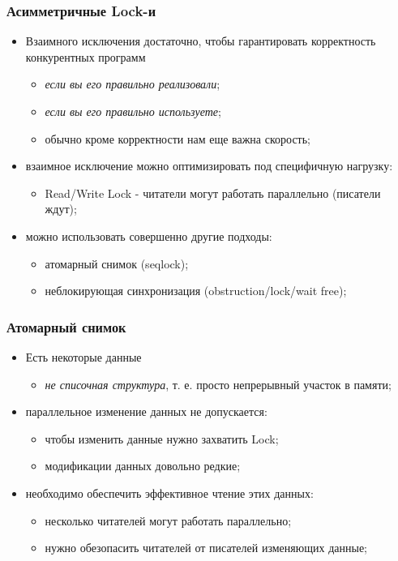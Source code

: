 \begin{frame}
\frametitle{Асимметричные Lock-и}

\begin{itemize}
  \item<1-> Взаимного исключения достаточно, чтобы гарантировать корректность
        конкурентных программ
        \begin{itemize}
          \item<2-> \emph{если вы его правильно реализовали};
          \item<3-> \emph{если вы его правильно используете};
          \item<4-> обычно кроме корректности нам еще важна скорость;
        \end{itemize}
  \item<5-> взаимное исключение можно оптимизировать под специфичную нагрузку:
        \begin{itemize}
          \item Read/Write Lock - читатели могут работать параллельно (писатели
                ждут);
        \end{itemize}
  \item<6-> можно использовать совершенно другие подходы:
        \begin{itemize}
          \item атомарный снимок (seqlock);
          \item неблокирующая синхронизация (obstruction/lock/wait free);
        \end{itemize}
\end{itemize}
\end{frame}

\begin{frame}
\frametitle{Атомарный снимок}

\begin{itemize}
  \item<1-> Есть некоторые данные
        \begin{itemize}
          \item \emph{не списочная структура}, т. е. просто непрерывный участок
                в памяти;
        \end{itemize}
  \item<2-> параллельное изменение данных не допускается:
        \begin{itemize}
          \item чтобы изменить данные нужно захватить Lock;
          \item модификации данных довольно редкие;
        \end{itemize}
  \item<3-> необходимо обеспечить эффективное чтение этих данных:
        \begin{itemize}
          \item несколько читателей могут работать параллельно;
          \item нужно обезопасить читателей от писателей изменяющих данные;
        \end{itemize}
\end{itemize}
\end{frame}

